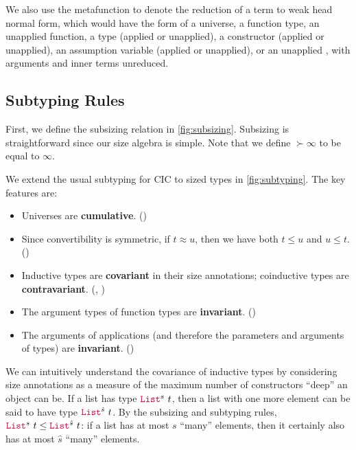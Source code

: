 We also use the metafunction \whnf to denote the reduction of a term to weak head normal form, which would have the form of a universe, a function type, an unapplied function, a \coinductive type (applied or unapplied), a constructor (applied or unapplied), an assumption variable (applied or unapplied), or an unapplied \cofixpoint, with arguments and inner terms unreduced.

\subsection{Subtyping Rules}\label{subsec:typing:subtyping}



First, we define the subsizing relation in \autoref{fig:subsizing}.
Subsizing is straightforward since our size algebra is simple.
Note that we define $\succ{\infty}$ to be equal to $\infty$.



We extend the usual subtyping for CIC to sized types in \autoref{fig:subtyping}.
The key features are:

\begin{itemize}
    \item Universes are \textbf{cumulative}. ()
    \item Since convertibility is symmetric, if $t \approx u$, then we have both $t \leq u$ and $u \leq t$. ()
    \item Inductive types are \textbf{covariant} in their size annotations; coinductive types are \textbf{contravariant}. (, )
    \item The argument types of function types are \textbf{invariant}. ()
    \item The arguments of applications (and therefore the parameters and arguments of \coinductive types) are \textbf{invariant}. ()
\end{itemize}

We can intuitively understand the covariance of inductive types by considering size annotations as a measure of the maximum number of constructors ``deep'' an object can be.
If a list has type $\List^s ~ t$, then a list with one more element can be said to have type $\List^{\hat{s}} ~ t$.
By the subsizing and subtyping rules, $\List^s ~ t \leq \List^{\hat{s}} ~ t$: if a list has at most $s$ ``many'' elements, then it certainly also has at most $\hat{s}$ ``many'' elements.

